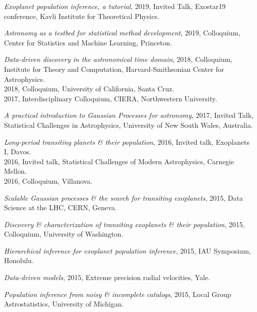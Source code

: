 \documentclass[12pt,letterpaper]{article}
\begin{document}
\begin{list}{}{\cvlist}
  \item \emph{Exoplanet population inference, a tutorial},
        2019, Invited Talk, Exostar19 conference,
        Kavli Institute for Theoretical Physics.

  \item \emph{Astronomy as a testbed for statistical method development},
        2019, Colloquium, Center for Statistics and Machine Learning,
        Princeton.

  \item \emph{Data-driven discovery in the astronomical time domain},
        2018, Colloquium, Institute for Theory and Computation,
        Harvard-Smithsonian Center for Astrophysics.\\
        2018, Colloquium, University of California, Santa Cruz.\\
        2017, Interdisciplinary Colloquium, CIERA, Northwestern University.

  \item \emph{A practical introduction to Gaussian Processes for astronomy},
        2017, Invited Talk, Statistical Challenges in Astrophysics,
        University of New South Wales, Australia.

  \item \emph{Long-period transiting planets \& their population},
        2016, Invited talk, Exoplanets I, Davos. \\
        2016, Invited talk, Statistical Challenges of Modern Astrophysics,
        Carnegie Mellon.\\
        2016, Colloquium, Villanova.

  \item \emph{Scalable Gaussian processes \& the search for transiting
          exoplanets}, 2015, Data Science at the LHC, CERN, Geneva.

  \item \emph{Discovery \& characterization of transiting exoplanets \& their
          population}, 2015, Colloquium, University of Washington.

  \item \emph{Hierarchical inference for exoplanet population inference},
        2015, IAU Symposium, Honolulu.

  \item \emph{Data-driven models}, 2015, Extreme precision radial velocities,
        Yale.

  \item \emph{Population inference from noisy \& incomplete catalogs}, 2015,
        Local Group Astrostatistics, University of Michigan.


\end{list}
\end{document}
